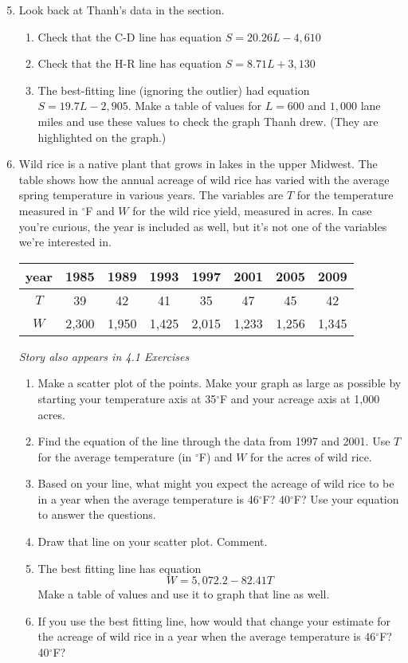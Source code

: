 \begin{enumerate} 
\setcounter{enumi}{4}

\item Look back at Thanh's data in the section.
\begin{enumerate}
\item Check that the C-D line has equation $S=20.26L-4,610$
\item Check that the H-R line has equation $S=8.71L+3,130$
\item The best-fitting line (ignoring the outlier) had equation $S = 19.7L-2,905$.  Make a table of values for $L=600$ and $1,000$ lane miles and use these values to check the graph Thanh drew.  (They are highlighted on the graph.)
\end{enumerate}

\item Wild rice is a native plant that grows in lakes in the upper Midwest.  The table shows how the annual acreage of wild rice has varied with the average spring temperature in various years.  The variables are $T$ for the temperature measured in $^{\circ}$F and $W$ for the wild rice yield, measured in acres.  In case you're curious, the year is included as well, but it's not one of the variables we're interested in.
\begin{center}
\begin{tabular} {|c||c|c |c|c|c|c|c|}  \hline
year & 1985 & 1989 & 1993 & 1997 & 2001 & 2005 & 2009  \\ \hline
$T$ & 39 & 42 & 41 & 35 & 47 & 45 & 42
 \\ \hline
$W$& 2,300 & 1,950 & 1,425 & 2,015 & 1,233 & 1,256 & 1,345 \\ \hline
\end{tabular}
\end{center}
\hfill \emph{Story also appears in 4.1 Exercises}
\begin{enumerate}
\item Make a scatter plot of the points.  Make your graph as large as possible by starting your temperature axis at 35$^{\circ}$F and your acreage axis at 1,000 acres.
\item Find the equation of the line through the data from 1997 and 2001. Use $T$ for the average temperature (in $^{\circ}$F) and $W$ for the acres of wild rice.
\item Based on your line, what might you expect the acreage of wild rice to be in a year when the average temperature is 46$^{\circ}$F?  40$^{\circ}$F?  Use your equation to answer the questions.
\item Draw that line on your scatter plot.  Comment.
\item The best fitting line has equation $$W=5,072.2-82.41T$$  Make a table of values and use it to graph that line as well.
\item If you use the best fitting line, how would that change your estimate for the acreage of wild rice in a year when the average temperature is 46$^{\circ}$F?  40$^{\circ}$F?  
\end{enumerate} %


\end{enumerate}
